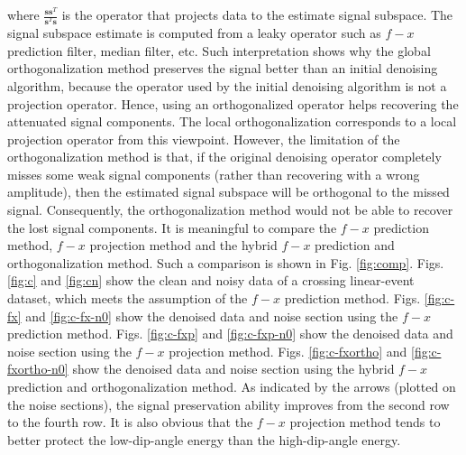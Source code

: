 {where $\frac{\mathbf{s}\mathbf{s}^T}{\mathbf{s}^T\mathbf{s}}$ is the operator that projects data to the estimate signal subspace. The signal subspace estimate is computed from a leaky operator such as $f-x$ prediction filter, median filter, etc. Such interpretation shows why the global orthogonalization method preserves the signal better than an initial denoising algorithm, because the operator used by the initial denoising algorithm is not a projection operator. Hence, using an orthogonalized operator helps recovering the attenuated signal components. The local orthogonalization corresponds to a local projection operator from this viewpoint. However, the limitation of the orthogonalization method is that, if the original denoising operator completely misses some weak signal components (rather than recovering with a wrong amplitude), then the estimated signal subspace will be orthogonal to the missed signal. Consequently, the orthogonalization method would not be able to recover the lost signal components. It is meaningful to compare the $f-x$ prediction method, $f-x$ projection method and the hybrid $f-x$ prediction and orthogonalization method. Such a comparison is shown in Fig. \ref{fig:comp}. Figs. \ref{fig:c} and \ref{fig:cn} show the clean and noisy data of a crossing linear-event dataset, which meets the assumption of the $f-x$ prediction method. Figs. \ref{fig:c-fx} and \ref{fig:c-fx-n0} show the denoised data and noise section using the $f-x$ prediction method.  Figs. \ref{fig:c-fxp} and \ref{fig:c-fxp-n0} show the denoised data and noise section using the $f-x$ projection method. Figs. \ref{fig:c-fxortho} and \ref{fig:c-fxortho-n0} show the denoised data and noise section using the hybrid $f-x$ prediction and orthogonalization method. As indicated by the arrows (plotted on the noise sections), the signal preservation ability improves from the second row to the fourth row. It is also obvious that the $f-x$ projection method tends to better protect the low-dip-angle energy than the high-dip-angle energy.}


